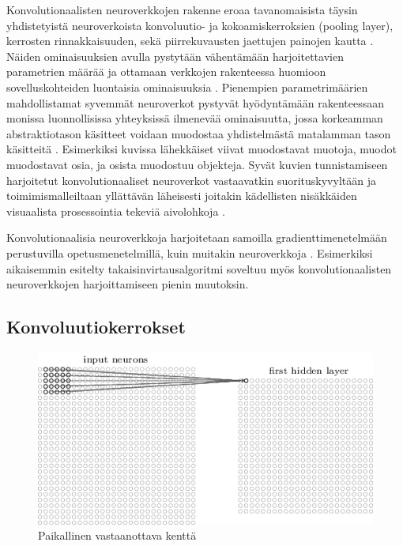 \documentclass[finnish]{tktltiki2}
\theoremstyle{definition}
\theoremstyle{remark}
\begin{document}
    Konvolutionaalisten neuroverkkojen rakenne eroaa tavanomaisista täysin yhdistetyistä neuroverkoista konvoluutio- ja kokoamiskerroksien (pooling layer), kerrosten rinnakkaisuuden, sekä piirrekuvausten jaettujen painojen kautta \cite{Lecun-et-al-1989-convnets}. Näiden ominaisuuksien avulla pystytään vähentämään harjoitettavien parametrien määrää ja ottamaan verkkojen rakenteessa huomioon sovelluskohteiden luontaisia ominaisuuksia \cite{SzegedyLJSRAEVR14}. Pienempien parametrimäärien mahdollistamat syvemmät neuroverkot pystyvät hyödyntämään rakenteessaan monissa luonnollisissa yhteyksissä ilmenevää ominaisuutta, jossa korkeamman abstraktiotason käsitteet voidaan muodostaa yhdistelmästä matalamman tason käsitteitä \cite{nature-lecun15}. Esimerkiksi kuvissa lähekkäiset viivat muodostavat muotoja, muodot muodostavat osia, ja osista muodostuu objekteja. Syvät kuvien tunnistamiseen harjoitetut konvolutionaaliset neuroverkot vastaavatkin suorituskyvyltään ja toimimismalleiltaan yllättävän läheisesti joitakin kädellisten nisäkkäiden visuaalista prosessointia tekeviä aivolohkoja \cite{deep-neural-rival-primate-cortex}.
    
    Konvolutionaalisia neuroverkkoja harjoitetaan samoilla gradienttimenetelmään perustuvilla opetusmenetelmillä, kuin muitakin neuroverkkoja \cite{Nielsen-neural}. Esimerkiksi aikaisemmin esitelty takaisinvirtausalgoritmi soveltuu myös konvolutionaalisten neuroverkkojen harjoittamiseen pienin muutoksin.

    \subsection{Konvoluutiokerrokset}
    \label{chap:convolutional-layers}

    \begin{figure}[h]
      \centering
      \includegraphics[scale=0.5]{local-receptive}
      \caption{Paikallinen vastaanottava kenttä \cite{Nielsen-neural}}
      \label{pic:local-receptive}
    \end{figure}
\end{document}
